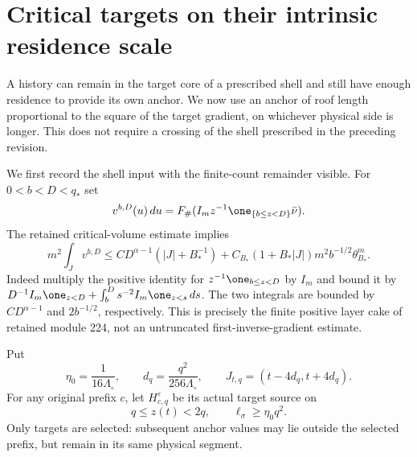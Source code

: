 \section{Critical targets on their intrinsic residence scale}
\label{sec:v95-anchors}
A history can remain in the target core of a prescribed shell and still
have enough residence to provide its own anchor. We now use an anchor
of roof length proportional to the square of the target gradient,
on whichever physical side is longer. This does not require a crossing
of the shell prescribed in the preceding revision.

We first record the shell input with the finite-count remainder visible.
For $0<b<D<q_*$ set
\[
 v^{b,D}(u)\,du=F_\#(I_m z^{-1}\one_{\{b\le z<D\}}\bar\nu).
\]
The retained critical-volume estimate implies
\begin{equation}\label{eq:v95-shell-input}
 m^2\int_J v^{b,D}\le
 C D^{\alpha-1}(|J|+B_*^{-1})
 +C_{B_*}(1+B_*|J|)m^2b^{-1/2}\theta_{B_*}^m.
\end{equation}
Indeed multiply the positive identity for $z^{-1}\one_{b\le z<D}$
by $I_m$ and bound it by
$D^{-1}I_m\one_{z<D}+\int_b^D s^{-2}I_m\one_{z<s}\,ds$.
The two integrals are bounded by
$C D^{\alpha-1}$ and $2b^{-1/2}$, respectively. This is precisely
the finite positive layer cake of retained module 224, not an
untruncated first-inverse-gradient estimate.

Put
\[
 \eta_0=\frac1{16\Lambda_\circ},\qquad
 d_q=\frac{q^2}{256\Lambda_\circ},\qquad J_{t,q}=(t-4d_q,t+4d_q).
\]
For any original prefix $c$, let $H_{c,q}^\varepsilon$ be its actual
target source on
\[
 q\le z(t)<2q,\qquad \ell_\sigma\ge\eta_0q^2.
\]
Only targets are selected: subsequent anchor values may lie outside
the selected prefix, but remain in its same physical segment.

